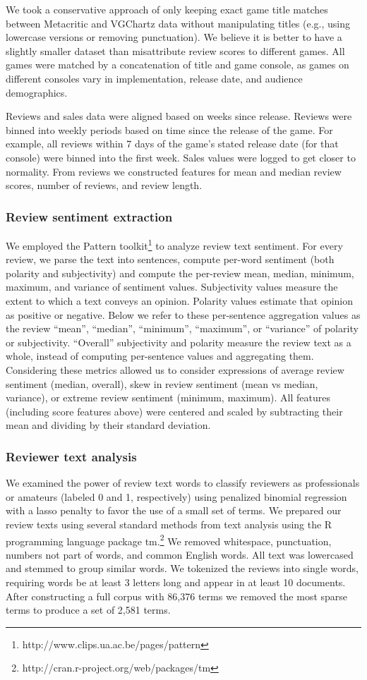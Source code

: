 \documentclass{sig-alternate}
\begin{document}
We took a conservative approach of only keeping exact game title matches
between Metacritic and VGChartz data without manipulating titles (e.g.,
using lowercase versions or removing punctuation). We believe it is better to have a slightly smaller dataset than misattribute review scores to different games. All games were matched by a concatenation of title and game console, as games on different consoles vary in implementation, release date, and audience demographics. 

Reviews and sales data were aligned based on weeks since release. Reviews were binned into weekly periods based on time since the release of the game. For example, all reviews within 7 days of the game's stated release date (for that console) were binned into the first week. Sales values were logged to get closer to normality. From reviews we constructed features for mean and median review scores, number of reviews, and review length.

\subsubsection{Review sentiment extraction}
We employed the Pattern toolkit\footnote{http://www.clips.ua.ac.be/pages/pattern} to analyze review text sentiment. For every review, we parse the text into sentences, compute per-word sentiment (both polarity and subjectivity) and compute the per-review mean, median, minimum, maximum, and variance of sentiment values. Subjectivity values measure the extent to which a text conveys an opinion. Polarity values estimate that opinion as positive or negative. Below we refer to these per-sentence aggregation values as the review ``mean'', ``median'', ``minimum'', ``maximum'', or ``variance'' of polarity or subjectivity. ``Overall'' subjectivity and polarity measure the review text as a whole, instead of computing per-sentence values and aggregating them. Considering these metrics allowed us to consider expressions of average review sentiment (median, overall), skew in review sentiment (mean vs median, variance), or extreme review sentiment (minimum, maximum). All features (including score features above) were centered and scaled by subtracting their mean and dividing by their standard deviation.

\subsubsection{Reviewer text analysis}
We examined the power of review text words to classify reviewers as professionals or amateurs (labeled 0 and 1, respectively) using penalized binomial regression with a lasso penalty to favor the use of a small set of terms.
We prepared our review texts using several standard methods from text analysis using the R programming language package tm.\footnote{http://cran.r-project.org/web/packages/tm} We removed whitespace, punctuation, numbers not part of words, and common English words. All text was lowercased and stemmed to group similar words. We tokenized the reviews into single words, requiring words be at least 3 letters long and appear in at least 10 documents. After constructing a full corpus with 86,376 terms we removed the most sparse terms to produce a set of 2,581 terms.
\end{document}
